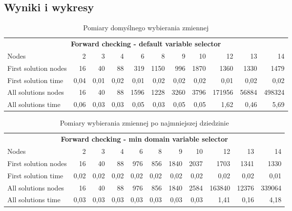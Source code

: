 \documentclass[12pt,a4paper]{article}
\begin{document}
\subsection{Wyniki i wykresy}
\begin{table}[htbp]
  \centering
    \begin{tabular}{lrrrrrrrrrr}
    \multicolumn{11}{c}{\textbf{Forward checking - default variable selector}} \\
    Nodes & 2     & 3     & 4     & 6     & 8     & 9     & 10    & 12    & 13    & 14 \\
\cmidrule{2-11}    First solution nodes & 16    & 40    & 88    & 319   & 1150  & 996   & 1870  & 1360  & 1330  & 1479 \\
    First solution time & 0,04  & 0,01  & 0,02  & 0,01  & 0,02  & 0,02  & 0,02  & 0,01  & 0,02  & 0,02 \\
    All solutions nodes & 16    & 40    & 88    & 1596  & 1228  & 3260  & 3796  & 171956 & 56884 & 498324 \\
    All solutions time & 0,06  & 0,03  & 0,03  & 0,05  & 0,03  & 0,05  & 0,05  & 1,62  & 0,46  & 5,69 \\
    \end{tabular}%
  \caption{Pomiary domyślnego wybierania zmiennej}
  \label{tab:addlabel}%
\end{table}%
\begin{table}[htbp]
  \centering
    \begin{tabular}{lrrrrrrrrrr}
    \multicolumn{11}{c}{\textbf{Forward checking - min domain variable selector}} \\
    Nodes & 2     & 3     & 4     & 6     & 8     & 9     & 10    & 12    & 13    & 14 \\
\cmidrule{2-11}    First solution nodes & 16    & 40    & 88    & 976   & 856   & 1840  & 2037  & 1703  & 1341  & 1330 \\
    First solution time & 0,02  & 0,02  & 0,02  & 0,02  & 0,02  & 0,02  & 0,02  & 0,02  & 0,02  & 0,01 \\
    All solutions nodes & 16    & 40    & 88    & 976   & 856   & 1840  & 2584  & 163840 & 12376 & 339064 \\
    All solutions time & 0,03  & 0,03  & 0,03  & 0,03  & 0,03  & 0,03  & 0,03  & 1,41  & 0,16  & 4,18 \\
    \end{tabular}%
  \caption{Pomiary wybierania zmiennej po najmniejszej dziedzinie}
  \label{tab:addlabel}%
\end{table}%
\end{document}

